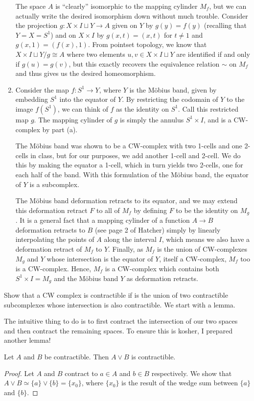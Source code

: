 \begin{homework}[e]
\begin{prf}
\begin{enumerate}[(1)]
			The space $A$ is ``clearly'' isomorphic to the mapping cylinder $M_f$, but we can actually write the desired isomorphism down without much trouble. Consider the projection $g:X\times I \sqcup Y \to A$ given on $Y$ by $g(y) = f(y)$ (recalling that $Y = X = S^1$) and on $X\times I$ by $g(x,t) = (x,t)$ for $t \neq 1$ and $g(x,1) = (f(x),1)$. From pointset topology, we know that $X\times I \sqcup Y/g \cong A$ where two elements $u,v \in X\times I \sqcup Y$ are identified if and only if $g(u) = g(v)$, but this exactly recovers the equivalence relation $\sim$ on $M_f$ and thus gives us the desired homeomorphism.

		\item Consider the map $f:S^1 \to Y$, where $Y$ is the M\"obius band, given by embedding $S^1$ into the equator of $Y$. By restricting the codomain of $Y$ to the image $f(S^1)$, we can think of $f$ as the identity on $S^1$. Call this restricted map $g$. The mapping cylinder of $g$ is simply the annulus $S^1\times I$, and is a CW-complex by part (a). 

			The M\"obius band was shown to be a CW-complex with two 1-cells and one 2-cells in class, but for our purposes, we add another 1-cell and 2-cell. We do this by making the equator a 1-cell, which in turn yields two 2-cells, one for each half of the band. With this formulation of the M\"obius band, the equator of $Y$ is a subcomplex.

			The M\"obius band deformation retracts to its equator, and we may extend this deformation retract $F$ to all of $M_f$ by defining $F$ to be the identity on $M_g$. It is a general fact that a mapping cylinder of a function $A\to B$ deformation retracts to $B$ (see page 2 of Hatcher) simply by linearly interpolating the points of $A$ along the interval $I$, which means we also have a deformation retract of $M_f$ to $Y$. Finally, as $M_f$ is the union of CW-complexes $M_g$ and $Y$ whose intersection is the equator of $Y$, itself a CW-complex, $M_f$ too is a CW-complex. Hence, $M_f$ is a CW-complex which contains both $S^1\times I = M_g$ and the M\"obius band $Y$ as deformation retracts.
	\end{enumerate}
	\end{prf}
	\newpage
	 Show that a CW complex is contractible if is the union of two contractible subcomplexes whose intersection is also contractible.
	We start with a lemma.
	\begin{prf}
		The intuitive thing to do is to first contract the intersection of our two spaces and then contract the remaining spaces. To ensure this is kosher, I prepared another lemma! 
		\begin{lem}
			Let $A$ and $B$ be contractible. Then $A \vee B$ is contractible.
		\end{lem}
		\begin{proof}
		   Let $A$ and $B$ contract to $a \in A$ and $b \in B$ respectively. We show that $A \vee B \simeq \{a\} \vee \{b\} = \{x_0\}$, where $\{x_0\}$ is the result of the wedge sum between $\{a\}$ and $\{b\}$. 
		   

\end{proof}
\end{prf}
\end{homework}
